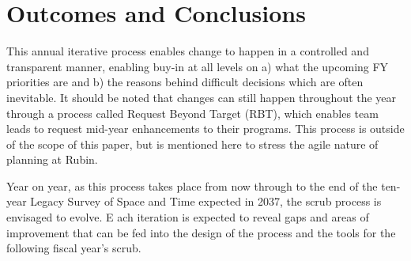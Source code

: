 \section{Outcomes and Conclusions} \label{sec:outcomes}

This annual iterative process enables change to happen in a controlled and transparent manner, enabling buy-in at all levels on a) what the upcoming FY priorities are and b) the reasons behind difficult decisions which are often inevitable. 
It should be noted that changes can still happen throughout the year through a process called Request Beyond Target (RBT), which enables team leads to request mid-year enhancements to their programs. 
This process is outside of the scope of this paper, but is mentioned here to stress the agile nature of planning at Rubin.

Year on year, as this process takes place from now through to the end of the ten-year Legacy Survey of Space and Time expected in 2037, the scrub process is envisaged to evolve. E
ach iteration is expected to reveal gaps and areas of improvement that can be fed into the design of the process and the tools for the following fiscal year’s scrub.
